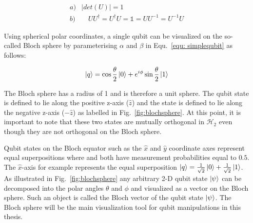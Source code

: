 \begin{align}
\label{equ:unitarydef1}
a)& \mid det(U) \mid = 1 \\ 
\label{equ:unitarydef2}
b)& \quad UU^\dagger = U^\dagger U = \mathbb{1} = UU^{-1} = U^{-1}U
\end{align} 

Using spherical polar coordinates, a single qubit can be visualized on the so-called Bloch sphere by parameterising $\alpha$ and $\beta$ in Equ.~\ref{equ: simplequbit} as follows:

\begin{equation}
\label{equ: blochqubit}
\ket{q} = \cos\frac{\theta}{2} \ket{0} + e^{i \phi} \sin\frac{\theta}{2} \ket{1}
\end{equation}

The Bloch sphere has a radius of 1 and is therefore a unit sphere. The \0 qubit state is defined to lie along the positive z-axis ($\hat{z}$) and the \1 state is defined to lie along the negative z-axis ($-\hat{z}$) as labelled in Fig.~\ref{fig:blochsphere}. At this point, it is important to note that these two states are mutually orthogonal in $\mathcal{H}_{2}$ even though they are not orthogonal on the Bloch sphere. 

Qubit states on the Bloch equator such as the $\hat{x}$ and $\hat{y}$ coordinate axes represent equal superpositions where \0 and \1 both have measurement probabilities equal to $0.5$. The $\hat{x}$-axis for example represents the equal superposition $\ket{q} = \frac{1}{\sqrt{2}} \ket{0} + \frac{1}{\sqrt{2}} \ket{1}$. As illustrated in Fig.~\ref{fig:blochsphere} any arbitrary 2-D qubit state $\ket{\psi}$ can be decomposed into the polar angles $\theta$ and $\phi$ and visualized as a vector on the Bloch sphere. Such an object is called the Bloch vector of the qubit state $\ket{\psi}$. The Bloch sphere will be the main visualization tool for qubit manipulations in this thesis.

